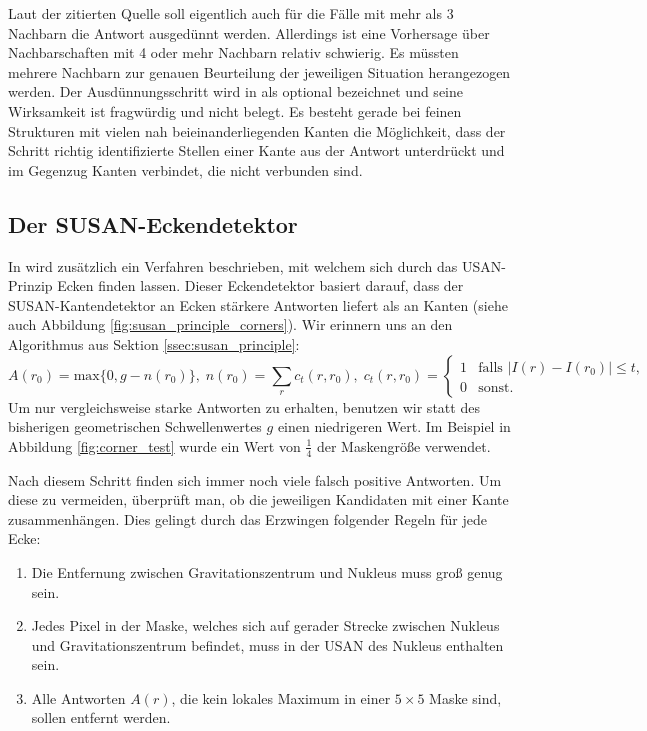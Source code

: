 \documentclass[a4paper, 11pt]{report}
\theoremstyle{definition}
\begin{document}
			Laut der zitierten Quelle \cite{thinout} soll eigentlich auch für die Fälle mit mehr als 3 Nachbarn die Antwort ausgedünnt werden. Allerdings ist eine Vorhersage über Nachbarschaften mit 4 oder mehr Nachbarn relativ schwierig. Es müssten mehrere Nachbarn zur genauen Beurteilung der jeweiligen Situation herangezogen werden.
			Der Ausdünnungsschritt wird in \cite{SUSAN} als optional bezeichnet und seine Wirksamkeit ist fragwürdig und nicht belegt. Es besteht gerade bei feinen Strukturen mit vielen nah beieinanderliegenden Kanten die Möglichkeit, dass der Schritt richtig identifizierte Stellen einer Kante aus der Antwort unterdrückt und im Gegenzug Kanten verbindet, die nicht verbunden sind.

		\subsection{Der SUSAN-Eckendetektor}\label{ssec:corner_detector}
			In \cite{SUSAN} wird zusätzlich ein Verfahren beschrieben, mit welchem sich durch das USAN-Prinzip Ecken finden lassen. Dieser Eckendetektor basiert darauf, dass der SUSAN-Kantendetektor an Ecken stärkere Antworten liefert als an Kanten (siehe auch Abbildung \ref{fig:susan_principle_corners}).
			Wir erinnern uns an den Algorithmus aus Sektion \ref{ssec:susan_principle}:
			$$
				A(r_0) = \text{max}\{0, g - n(r_0)\},\;
				n(r_0) = \sum_r c_t(r, r_0),\;
				c_t(r, r_0) =
					\begin{cases}
						1 	& \text{falls } |I(r) - I(r_0)| \leq t, 	\\
						0 	& \text{sonst.}
					\end{cases}
			$$
			Um nur vergleichsweise starke Antworten zu erhalten, benutzen wir statt des bisherigen geometrischen Schwellenwertes $g$ einen niedrigeren Wert. Im Beispiel in Abbildung \ref{fig:corner_test} wurde ein Wert von $\frac{1}{4}$ der Maskengröße verwendet.

			Nach diesem Schritt finden sich immer noch viele falsch positive Antworten. Um diese zu vermeiden, überprüft man, ob die jeweiligen Kandidaten mit einer Kante zusammenhängen. Dies gelingt durch das Erzwingen folgender Regeln für jede Ecke:

			\begin{enumerate}
				\item Die Entfernung zwischen Gravitationszentrum und Nukleus muss groß genug sein.
				\item Jedes Pixel in der Maske, welches sich auf gerader Strecke zwischen Nukleus und Gravitationszentrum befindet, muss in der USAN des Nukleus enthalten sein.
				\item Alle Antworten $A(r)$, die kein lokales Maximum in einer $5\times 5$ Maske sind, sollen entfernt werden.
			\end{enumerate}
\end{document}
